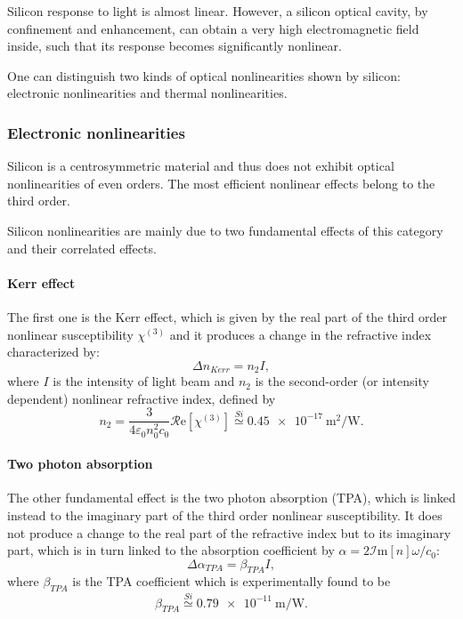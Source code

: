 Silicon response to light is almost linear.
However, a silicon optical cavity, by confinement and enhancement, can obtain a very high electromagnetic field inside, such that its response becomes significantly nonlinear.

One can distinguish two kinds of optical nonlinearities shown by silicon: electronic nonlinearities and thermal nonlinearities.


\subsubsection{Electronic nonlinearities}
\label{sssec:Electronic_nonlinearities}
Silicon is a centrosymmetric material and thus does not exhibit optical nonlinearities of even orders.
The most efficient nonlinear effects belong to the third order.

Silicon nonlinearities are mainly due to two fundamental effects of this category and their correlated effects.
\paragraph{Kerr effect}
The first one is the Kerr effect, which is given by the real part of the third order nonlinear susceptibility $\chi^{(3)}$ and it produces a change in the refractive index characterized by:
\begin{equation}
	\Delta n_{Kerr} = n_2 I,
\end{equation}
where $I$ is the intensity of light beam and $n_2$ is the second-order (or intensity dependent) nonlinear refractive index, defined by
\begin{equation}
	n_2 = \dfrac{3}{4\varepsilon_0 n_0^2 c_0} \mathcal{R}\mathrm{e} \left[ \chi^{(3)} \right]
	\overset{Si}{\simeq} \SI{0.45e-17}{\square\m\per\W}.
\end{equation}

\paragraph{Two photon absorption}
The other fundamental effect is the two photon absorption (TPA), which is linked instead to the imaginary part of the third order nonlinear susceptibility.
It does not produce a change to the real part of the refractive index but to its imaginary part, which is in turn linked to the absorption coefficient by $\alpha=2\mathcal{I}\mathrm{m}[n]\omega/c_0$:
\begin{equation}
	\Delta\alpha_{TPA} = \beta_{TPA} I,
\end{equation}
where $\beta_{TPA}$ is the TPA coefficient which is experimentally found to be
\begin{equation}
	\beta_{TPA} \overset{Si}{\simeq} \SI{0.79e-11}{\m\per\W}.
\end{equation}

